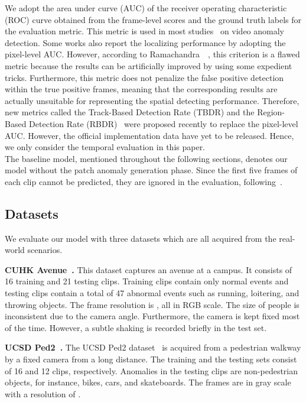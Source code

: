 \documentclass[10pt,twocolumn,letterpaper]{article}
\begin{document}
 We adopt the area under curve (AUC) of the receiver operating characteristic (ROC) curve obtained from the frame-level scores and the ground truth labels for the evaluation metric. This metric is used in most studies~\cite{chang2020clustering, georgescu2021anomaly, Georgescu_2021, lu2020few, luo2017revisit, nguyen2019hybrid, park2020learning, yu2020cloze, zaheer2020old} on video anomaly detection. Some works also report the localizing performance by adopting the pixel-level AUC. However, according to Ramachandra~\etal~\cite{9271895}, this criterion is a flawed metric because the results can be artificially improved by using some expedient tricks. Furthermore, this metric does not penalize the false positive detection within the true positive frames, meaning that the corresponding results are actually unsuitable for representing the spatial detecting performance. Therefore, new metrics called the Track-Based Detection Rate (TBDR) and the Region-Based Detection Rate (RBDR)~\cite{Ramachandra_2020_WACV} were proposed recently to replace the pixel-level AUC. However, the official implementation data have yet to be released. Hence, we only consider the temporal evaluation in this paper. \\
\indent The baseline model, mentioned throughout the following sections, denotes our model without the patch anomaly generation phase. Since the first five frames of each clip cannot be predicted, they are ignored in the evaluation, following~\cite{Liu_2018_CVPR, park2020learning, tang2020integrating}.

\subsection{Datasets}
We evaluate our model with three datasets which are all acquired from the real-world scenarios. 
\vspace{0.2em}

{\noindent \bf CUHK Avenue~\cite{lu2013abnormal}.}
This dataset captures an avenue at a campus. It consists of 16 training and 21 testing clips. Training clips contain only normal events and testing clips contain a total of 47 abnormal events such as running, loitering, and throwing objects. The frame resolution is , all in RGB scale. The size of people is inconsistent due to the camera angle. Furthermore, the camera is kept fixed most of the time. However, a subtle shaking is recorded briefly in the test set. 

\vspace{0.2em}
{\noindent \bf UCSD Ped2~\cite{mahadevan2010anomaly}.}
The UCSD Ped2 dataset~\cite{mahadevan2010anomaly} is acquired from a pedestrian walkway by a fixed camera from a long distance. The training and the testing sets consist of 16 and 12 clips, respectively. Anomalies in the testing clips are non-pedestrian objects, for instance, bikes, cars, and skateboards. The frames are in gray scale with a resolution of . 
\end{document}
